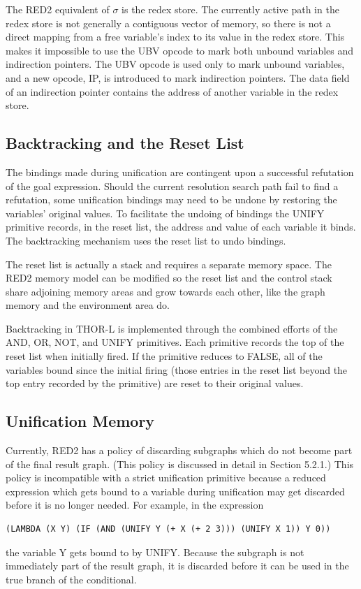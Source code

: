 The RED2 equivalent of \(\sigma\) is the redex store. The currently active path
in the redex store is not generally a contiguous vector of memory, so there is
not a direct mapping from a free variable's index to its value in the redex
store. This makes it impossible to use the UBV opcode to mark both unbound
variables and indirection pointers. The UBV opcode is used only to mark unbound
variables, and a new opcode, IP, is introduced to mark indirection pointers. The
data field of an indirection pointer contains the address of another variable
in the redex store.

\subsection{Backtracking and the Reset List}

The bindings made during unification are contingent upon a successful refutation
of the goal expression. Should the current resolution search path fail to find a
refutation, some unification bindings may need to be undone by restoring the
variables' original values. To facilitate the undoing of bindings the UNIFY
primitive records, in the reset list, the address and value of each variable it
binds. The backtracking mechanism uses the reset list to undo bindings.

The reset list is actually a stack and requires a separate memory space. The
RED2 memory model can be modified so the reset list and the control stack share
adjoining memory areas and grow towards each other, like the graph memory and
the environment area do.

Backtracking in THOR-L is implemented through the combined efforts of the AND,
OR, NOT, and UNIFY primitives. Each primitive records the top of the reset list
when initially fired. If the primitive reduces to FALSE, all of the variables
bound since the initial firing (those entries in the reset list beyond the top
entry recorded by the primitive) are reset to their original values.

\subsection{Unification Memory}

Currently, RED2 has a policy of discarding subgraphs which do not become part of
the final result graph. (This policy is discussed in detail in Section 5.2.1.)
This policy is incompatible with a strict unification primitive because a
reduced expression which gets bound to a variable during unification may get
discarded before it is no longer needed. For example, in the expression
\begin{verbatim}
(LAMBDA (X Y) (IF (AND (UNIFY Y (+ X (+ 2 3))) (UNIFY X 1)) Y 0))
\end{verbatim}
the variable Y gets bound to  by UNIFY. Because the
 subgraph is not immediately part of the result graph, it is
discarded before it can be used in the true branch of the conditional.

